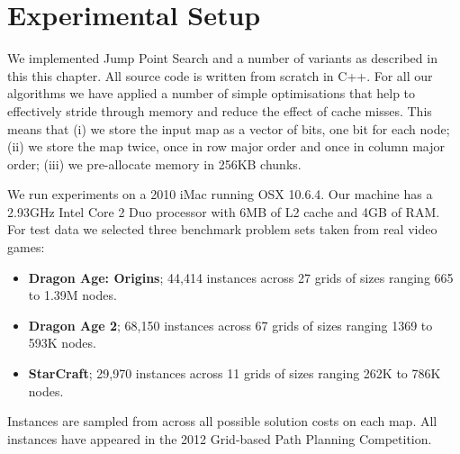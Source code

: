 \section{Experimental Setup}
\label{sec::setup}
We implemented Jump Point Search and a number of variants as described
in this this chapter. All source code is written from scratch in C++.
For all our algorithms we have applied a number of simple optimisations 
that help to effectively stride through memory and reduce the effect of 
cache misses.
This means that (i) we store the input map as a vector of bits, one bit 
for each node; (ii) we store the map twice, once in row major order and 
once in column major order; (iii) we pre-allocate memory in 256KB chunks.

We run experiments on a 2010 iMac running OSX 10.6.4. Our machine has 
a 2.93GHz Intel Core 2 Duo processor with 6MB of L2 cache and 4GB of RAM.
For test data we selected three benchmark problem sets taken from
real video games: 
\begin{itemize}
\item \textbf{Dragon Age: Origins}; 44,414 instances across 27 grids of 
sizes ranging 665 to 1.39M nodes.
\item \textbf{Dragon Age 2}; 68,150 instances across 67 grids of sizes 
ranging 1369 to 593K nodes.
\item \textbf{StarCraft}; 29,970 instances across 11 grids of sizes 
ranging 262K to 786K nodes.
\end{itemize}
Instances are sampled from across all possible solution costs on each map.
All instances have appeared in the 2012 Grid-based Path Planning Competition. 
%
